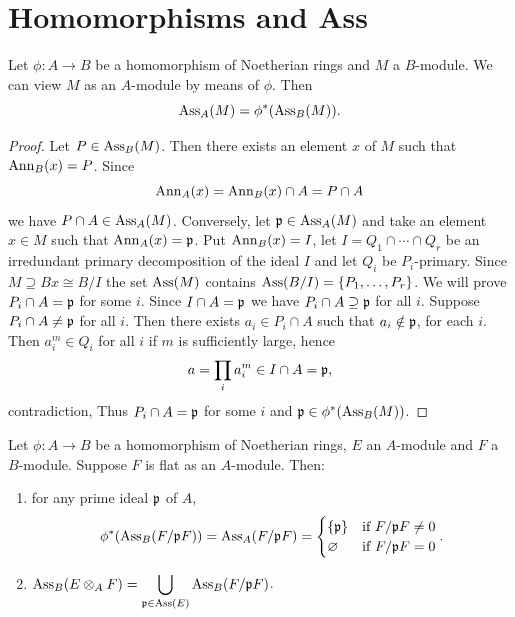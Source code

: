 \documentclass[../main]{subfiles}
\begin{document}
\section{Homomorphisms and Ass}\label{sec:09}

\begin{parproposition}\label{pro:09.01}
Let $\phi:A\longrightarrow B$ be a homomorphism of Noetherian rings and $M$ a $B$-module. We can view $M$ as an $A$-module by means of $\phi$. Then \[\operatorname{Ass}_A(M) =\phi^\ast(\operatorname{Ass}_B(M)).\]
\end{parproposition}

\begin{proof}
Let $P\in\operatorname{Ass}_B(M)$. Then there exists an element $x$ of $M$ such that $\operatorname{Ann}_B(x)=P$. Since \[\operatorname{Ann}_A(x) = \operatorname{Ann}_B(x)\cap A = P\cap A\] we have $P\cap A \in \operatorname{Ass}_A(M)$. Conversely, let $\mathfrak{p}\in \operatorname{Ass}_A(M)$ and take an element $x \in M$ such that $\operatorname{Ann}_A(x)=\mathfrak{p}$. Put $\operatorname{Ann}_B(x) = I$, let $I = Q_1\cap\cdots\cap Q_r$ be an irredundant primary decomposition of the ideal $I$ and let $Q_i$ be $P_i$-primary. Since $M\supseteq Bx \cong B/I$ the set $\operatorname{Ass}(M)$ contains $\operatorname{Ass}(B/I) = \{P_1,\dots, P_r\}$. We will prove $P_i\cap A = \mathfrak{p}$ for some $i$. Since $I\cap A=\mathfrak{p}$ we have $P_i\cap A\supseteq\mathfrak{p}$ for all $i$. Suppose $P_i\cap A\neq\mathfrak{p}$ for all $i$. Then there exists $a_i \in P_i\cap A$ such that $a_i\notin\mathfrak{p}$, for each $i$. Then $a_i^m \in Q_i$ for all $i$ if $m$ is sufficiently large, hence \[a = \prod_ia_i^m\in I\cap A=\mathfrak{p},\] contradiction, Thus $P_i\cap A = \mathfrak{p}$ for some $i$ and $\mathfrak{p}\in\phi^\ast(\operatorname{Ass}_B(M))$.
\end{proof}

\begin{partheorem}[Bourbaki]\label{thm:012}
Let $\phi:A\longrightarrow B$ be a homomorphism of Noetherian rings, $E$ an $A$-module and $F$ a $B$-module. Suppose $F$ is flat as an $A$-module. Then:
\begin{enumerate}
    \item for any prime ideal $\mathfrak{p}$ of $A$, \[\phi^\ast(\operatorname{Ass}_B(F/\mathfrak{p}F))=\operatorname{Ass}_A(F/\mathfrak{p}F)=\begin{cases}\{\mathfrak{p}\}&\text{if }F/\mathfrak{p}F\neq0\\\varnothing&\text{if }F/\mathfrak{p}F=0\end{cases}.\]
    \item $\operatorname{Ass}_B(E \otimes_A F) = \displaystyle \bigcup_{\mathfrak{p}\in\operatorname{Ass}(E)}\operatorname{Ass}_B(F/\mathfrak{p}F)$.
\end{enumerate}
\end{partheorem}
\end{document}
